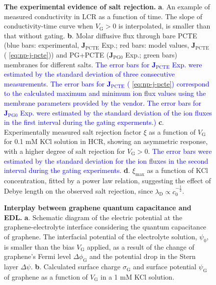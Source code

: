 \begin{figure}[H]
  \centering
  \caption{ \textbf{The experimental evidence of salt rejection.}
    \textbf{a}. An example of measured conductivity in LCR as a
    function of time. The slope of conductivity-time curve when
    $V_{\mathrm{G}}>0$ is interpolated, is smaller than that without
    gating. \textbf{b}. Molar diffusive flux through bare PCTE (blue
    bars: experimental, $\symbf{J}_{\mathrm{PCTE}}$ Exp.; red
    bars: model values, $\symbf{J}_{\mathrm{PCTE}}$
    ( \autoref{eq:np-j-pcte})) and PG+PCTE
    ($\symbf{J}_{\mathrm{PG0}}$ Exp.; green bars) membranes for
    different salts. \textcolor{blue}{The error bars for
      $\symbf{J}_{\mathrm{PCTE}}$ Exp. were estimated by the
      standard deviation of three consecutive measurements. The error bars
      for $\symbf{J}_{\mathrm{PCTE}}$ ( \autoref{eq:np-j-pcte})
      correspond to the calculated maximum and minimum ion flux values
      using the membrane parameters provided by the vendor. The error
      bars for $\symbf{J}_{\mathrm{PG0}}$ Exp. were estimated by
      the standard deviation of the ion fluxes in the first interval
      during the gating experments.)}  \textbf{c}. Experimentally
    measured salt rejection factor $\xi$ as a function of
    $V_{\mathrm{G}}$ for 0.1 mM KCl solution in HCR, showing an
    asymmetric response, with a higher degree of salt rejection for
    $V_{\mathrm{G}}>0$. \textcolor{blue}{The error bars were estimated
      by the standard deviation for the ion fluxes in the second
      interval during the gating experiments.}
    \textbf{d}. $\xi_{\mathrm{max}}$ as a function of KCl
    concentration, fitted by a power law relation, suggesting the
    effect of Debye length on the observed salt rejection, since
    $\lambda_{\mathrm{D}} \propto c_{0}^{-\frac{1}{2}}$.}
  \label{fig:np-2} 
\end{figure}

\begin{figure}[H]
  \centering
  \caption{\textbf{Interplay between graphene quantum capacitance and
      EDL.} \textbf{a}. Schematic diagram of the electric
    potential at the graphene-electrolyte interface considering the
    quantum capacitance of graphene. The interfacial potential of the
    electrolyte solution, $\psi_{0}$, is smaller than the bias
    $V_{\mathrm{G}}$ applied, as a result of the change of graphene's
    Fermi level $\Delta \phi_{\mathrm{G}}$ and the potential drop in
    the Stern layer $\Delta \psi$. \textbf{b}. Calculated surface
    charge $\sigma_{\mathrm{G}}$ and surface potential
    $\psi_{\mathrm{G}}$ of graphene as a function of $V_{\mathrm{G}}$
    in a 1 mM KCl solution. }
  \label{fig:np-3}
\end{figure}

